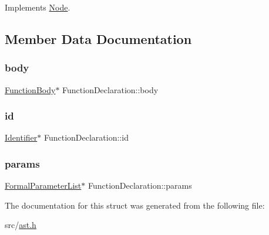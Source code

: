 Implements \hyperlink{struct_node_a82f29420d0a38efcc370352528e94e9b}{Node}.



\subsection{Member Data Documentation}
\mbox{\label{struct_function_declaration_ae35697bf8c8a45e490fa352d77a0c19b}} 
\subsubsection{\texorpdfstring{body}{body}}
{\footnotesize\ttfamily \hyperlink{struct_function_body}{Function\+Body}$\ast$ Function\+Declaration\+::body}

\mbox{\label{struct_function_declaration_a58de81497de15b01a5f92632c3e6f354}} 
\subsubsection{\texorpdfstring{id}{id}}
{\footnotesize\ttfamily \hyperlink{struct_identifier}{Identifier}$\ast$ Function\+Declaration\+::id}

\mbox{\label{struct_function_declaration_ab22f1972d3575c2b95778545d871658b}} 
\subsubsection{\texorpdfstring{params}{params}}
{\footnotesize\ttfamily \hyperlink{struct_formal_parameter_list}{Formal\+Parameter\+List}$\ast$ Function\+Declaration\+::params}



The documentation for this struct was generated from the following file\+:\begin{DoxyCompactItemize}
\item 
src/\hyperlink{ast_8h}{ast.\+h}\end{DoxyCompactItemize}
